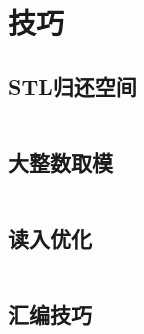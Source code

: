 \section{技巧}
\subsection{STL归还空间}
\inputminted{cpp}{\source/tricks/truly-release-container-space.cpp}
\subsection{大整数取模}
\inputminted{cpp}{\source/tricks/O1-multiply-mod.cpp}
\subsection{读入优化}
\inputminted{cpp}{\source/tricks/unbeatable-input-acceleration.cpp}
\subsection{汇编技巧}
\inputminted{cpp}{\source/tricks/tech.cpp}
